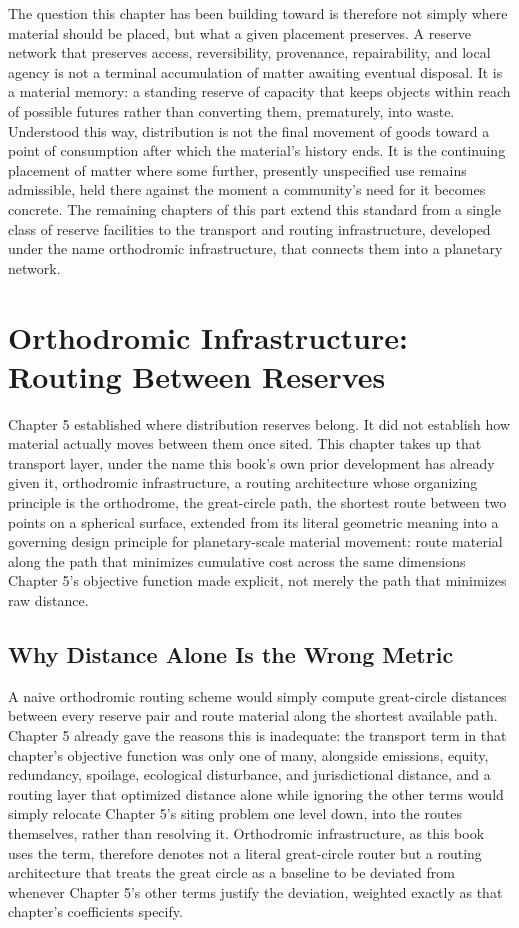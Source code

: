 \documentclass[11pt,oneside]{book}
\begin{document}
The question this chapter has been building toward is therefore not simply where material should be placed, but what a given placement preserves. A reserve network that preserves access, reversibility, provenance, repairability, and local agency is not a terminal accumulation of matter awaiting eventual disposal. It is a material memory: a standing reserve of capacity that keeps objects within reach of possible futures rather than converting them, prematurely, into waste. Understood this way, distribution is not the final movement of goods toward a point of consumption after which the material's history ends. It is the continuing placement of matter where some further, presently unspecified use remains admissible, held there against the moment a community's need for it becomes concrete. The remaining chapters of this part extend this standard from a single class of reserve facilities to the transport and routing infrastructure, developed under the name orthodromic infrastructure, that connects them into a planetary network.

\setcounter{chapter}{17}
\chapter{Orthodromic Infrastructure: Routing Between Reserves}

Chapter 5 established where distribution reserves belong. It did not establish how material actually moves between them once sited. This chapter takes up that transport layer, under the name this book's own prior development has already given it, orthodromic infrastructure, a routing architecture whose organizing principle is the orthodrome, the great-circle path, the shortest route between two points on a spherical surface, extended from its literal geometric meaning into a governing design principle for planetary-scale material movement: route material along the path that minimizes cumulative cost across the same dimensions Chapter 5's objective function made explicit, not merely the path that minimizes raw distance.

\section*{Why Distance Alone Is the Wrong Metric}

A naive orthodromic routing scheme would simply compute great-circle distances between every reserve pair and route material along the shortest available path. Chapter 5 already gave the reasons this is inadequate: the transport term in that chapter's objective function was only one of many, alongside emissions, equity, redundancy, spoilage, ecological disturbance, and jurisdictional distance, and a routing layer that optimized distance alone while ignoring the other terms would simply relocate Chapter 5's siting problem one level down, into the routes themselves, rather than resolving it. Orthodromic infrastructure, as this book uses the term, therefore denotes not a literal great-circle router but a routing architecture that treats the great circle as a baseline to be deviated from whenever Chapter 5's other terms justify the deviation, weighted exactly as that chapter's coefficients specify.
\end{document}
